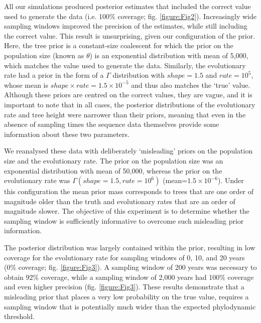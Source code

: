 \documentclass[11pt]{article}
\begin{document}
All our simulations produced posterior estimates that included the correct value used to generate the data (i.e. 100\% coverage; fig. \ref{figure:Fig2}). Increasingly wide sampling windows improved the precision of the estimates, while still including the correct value. This result is unsurprising, given our configuration of the prior. Here, the tree prior is a constant-size coalescent for which the prior on the population size (known as $\theta$) is an exponential distribution with mean of 5,000, which matches the value used to generate the data. Similarly, the evolutionary rate had a prior in the form of a $\Gamma$ distribution with $shape=1.5$ and $rate=10^{5}$, whose mean is $shape\times rate=1.5\times10^{-5}$ and thus also matches the `true' value. Although these priors are centred on the correct values, they are vague, and it is important to note that in all cases, the posterior distributions of the evolutionary rate and tree height were narrower than their priors, meaning that even in the absence of sampling times the sequence data themselves provide some information about these two parameters.

We reanalysed these data with deliberately `misleading' priors on the population size and the evolutionary rate. The prior on the population size was an exponential distribution with mean of 50,000, whereas the prior on the evolutionary rate was $\Gamma(shape=1.5, rate=10^{6})$ (mean=$1.5\times10^{-6}$). Under this configuration the mean prior mass corresponds to trees that are one order of magnitude older than the truth and evolutionary rates that are an order of magnitude slower. The objective of this experiment is to determine whether the sampling window is sufficiently informative to overcome such misleading prior information.

The posterior distribution was largely contained within the prior, resulting in low coverage for the evolutionary rate for sampling windows of 0, 10, and 20 years (0\% coverage; fig. \ref{figure:Fig3}). A sampling window of 200 years was necessary to obtain 92\% coverage, while a sampling window of 2,000 years had 100\% coverage and even higher precision (fig. \ref{figure:Fig3}). These results demonstrate that a misleading prior that places a very low probability on the true value, requires a sampling window that is potentially much wider than the expected phylodynamic threshold. 
\end{document}
